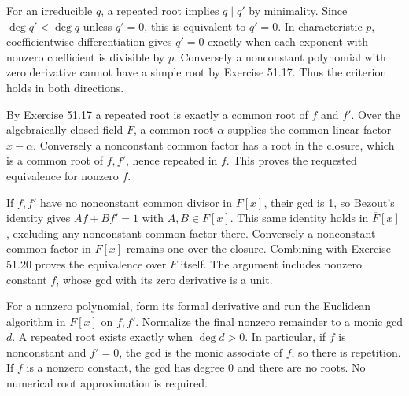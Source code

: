 For an irreducible $q$, a repeated root implies $q\mid q'$ by minimality. Since $\deg q'<\deg q$ unless $q'=0$, this is equivalent to $q'=0$. In characteristic $p$, coefficientwise differentiation gives $q'=0$ exactly when each exponent with nonzero coefficient is divisible by $p$. Conversely a nonconstant polynomial with zero derivative cannot have a simple root by Exercise 51.17. Thus the criterion holds in both directions.

By Exercise 51.17 a repeated root is exactly a common root of $f$ and $f'$. Over the algebraically closed field $\overline F$, a common root $\alpha$ supplies the common linear factor $x-\alpha$. Conversely a nonconstant common factor has a root in the closure, which is a common root of $f,f'$, hence repeated in $f$. This proves the requested equivalence for nonzero $f$.

If $f,f'$ have no nonconstant common divisor in $F[x]$, their gcd is 1, so Bezout's identity gives $Af+Bf'=1$ with $A,B\in F[x]$. This same identity holds in $\overline F[x]$, excluding any nonconstant common factor there. Conversely a nonconstant common factor in $F[x]$ remains one over the closure. Combining with Exercise 51.20 proves the equivalence over $F$ itself. The argument includes nonzero constant $f$, whose gcd with its zero derivative is a unit.

For a nonzero polynomial, form its formal derivative and run the Euclidean algorithm in $F[x]$ on $f,f'$. Normalize the final nonzero remainder to a monic gcd $d$. A repeated root exists exactly when $\deg d>0$. In particular, if $f$ is nonconstant and $f'=0$, the gcd is the monic associate of $f$, so there is repetition. If $f$ is a nonzero constant, the gcd has degree 0 and there are no roots. No numerical root approximation is required.
